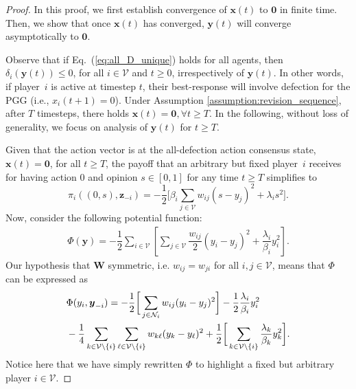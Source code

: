\documentclass[letterpaper, 10 pt, conference]{ieeeconf}  %
\newcommand{\vect}[1]{\boldsymbol{#1}}
\newcommand{\mat}[1]{\boldsymbol{#1}}
\renewcommand{\eqref}[1]{Eq.~(\ref{#1})}  %
\begin{document}
\begin{proof}
In this proof, we first establish convergence of $\vect x(t)$ to $\vect 0$ in finite time. Then, we show that once $\vect x(t)$ has converged, $\vect y(t)$ will converge asymptotically to $\vect 0$.

Observe that if \eqref{eq:all_D_unique} holds for all agents, then $\delta_i(\vect y(t))\leq0$, for all $i \in \mathcal{V}$ and $t\geq 0$, irrespectively of $\vect{y}(t)$. In other words, if player~$i$ is active at timestep $t$, their best-response will involve defection for the PGG (i.e., $x_i(t+1)=0$).
Under Assumption \ref{assumption:revision_sequence}, after $T$ timesteps, there holds $\vect{x}(t) = \vect 0, \forall t \geq T$. In the following, without loss of generality, we focus on analysis of $\vect y(t)$ for $t\geq T$. 

Given that the action vector is at the all-defection action consensus state, $\vect x(t) = \vect 0$, for all $t\geq T$, the payoff that an arbitrary but fixed player~$i$ receives for having action $0$ and opinion $s\in [0,1]$ for any time $t\geq T$ simplifies to
\begin{equation}\label{eq:payoff_all_defect}
    \pi_i((0,s),\vect{z}_{-i}) = -\dfrac{1}{2}\bigg[ \beta_i \sum_{j\in \mathcal{V}} w_{ij}(s-y_j)^2 + \lambda_i s^2 \bigg].
\end{equation}
Now, consider the following potential function:
\begin{align}\label{eq:Phi_sum}
    \Phi(\vect y) = -\dfrac{1}{2} \sum_{i\in \mathcal{V}} \left[\sum_{j\in \mathcal{V}} \dfrac{w_{ij}}{2}(y_i-y_j)^2 + \dfrac{\lambda_i}{\beta_i}y_i^2\right].
\end{align}
Our hypothesis that $\mat W$ symmetric, i.e. $w_{ij}=w_{ji}$ for all $i,j \in \mathcal{V}$, means that $\Phi$ can be expressed as
\begin{align}\label{eq:Phi_sum_individual}
    &\Phi(y_i,\vect y_{-i}) = -\frac{1}{2}\bigg[\sum_{j\in \mathcal{N}_i} w_{ij}(y_i-y_j)^2 \bigg]  -\frac{1}{2}\frac{\lambda_i}{\beta_i}y_i^2 \notag \\
    &-\frac{1}{4}\sum_{k \in \mathcal{V} \setminus \{i\}}\sum_{\ell \in \mathcal{V} \setminus \{i\}} w_{k\ell}
    (y_k - y_\ell)^2 + \frac{1}{2}\bigg[ \sum_{k\in \mathcal{V}\setminus\{i\}} \frac{\lambda_k}{\beta_k}y_k^2 \bigg].
\end{align}
Notice here that we have simply rewritten $\Phi$ to highlight a fixed but arbitrary player $i \in \mathcal{V}$.


\end{proof}
\end{document}
